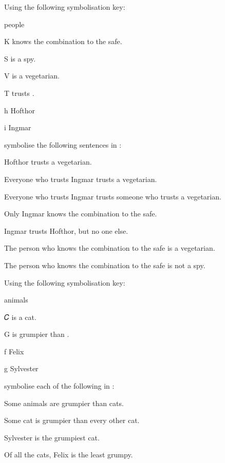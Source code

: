 \problempart
Using the following symbolisation key:
\begin{ekey}
\item[\text{domain}] people
\item[K]  knows the combination to the safe.
\item[S]  is a spy.
\item[V]  is a vegetarian.
\item[T]  trusts .
\item[h] Hofthor
\item[i] Ingmar
\end{ekey}
symbolise the following sentences in \FOL:
\begin{earg}
\item Hofthor trusts a vegetarian.
\item Everyone who trusts Ingmar trusts a vegetarian.
\item Everyone who trusts Ingmar trusts someone who trusts a vegetarian.
\item Only Ingmar knows the combination to the safe.
\item Ingmar trusts Hofthor, but no one else.
\item The person who knows the combination to the safe is a vegetarian.
\item The person who knows the combination to the safe is not a spy.
\end{earg}


\problempart
Using the following symbolisation key:
\begin{ekey}
\item[\text{domain}] animals
\item[𝐶\meta{x}]  is a cat.
\item[G]  is grumpier than .
\item[f] Felix 
\item[g] Sylvester
\end{ekey}
symbolise each of the following in \FOL:
\begin{earg}
\item  Some animals are grumpier than cats.
\item Some cat is grumpier than every other cat.
\item Sylvester is the grumpiest cat.
\item Of all the cats, Felix is the least grumpy.
\end{earg}

